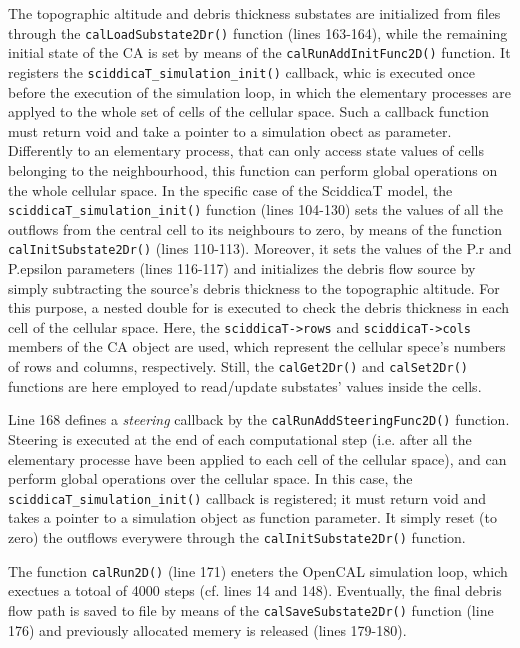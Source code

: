 The topographic altitude and debris thickness substates are
initialized from files through the \verb'calLoadSubstate2Dr()'
function (lines 163-164), while the remaining initial state of the CA
is set by means of the \verb'calRunAddInitFunc2D()' function. It
registers the \verb'sciddicaT_simulation_init()' callback, whic is
executed once before the execution of the simulation loop, in which
the elementary processes are applyed to the whole set of cells of the
cellular space. Such a callback function must return void and take a
pointer to a simulation obect as parameter. Differently to an
elementary process, that can only access state values of cells
belonging to the neighbourhood, this function can perform global
operations on the whole cellular space. In the specific case of the
SciddicaT model, the \verb'sciddicaT_simulation_init()' function
(lines 104-130) sets the values of all the outflows from the central
cell to its neighbours to zero, by means of the function
\verb'calInitSubstate2Dr()' (lines 110-113). Moreover, it sets the
values of the P.r and P.epsilon parameters (lines 116-117) and
initializes the debris flow source by simply subtracting the source's
debris thickness to the topographic altitude. For this purpose, a
nested double for is executed to check the debris thickness in each
cell of the cellular space. Here, the \verb'sciddicaT->rows' and
\verb'sciddicaT->cols' members of the CA object are used, which
represent the cellular spece's numbers of rows and columns,
respectively. Still, the \verb'calGet2Dr()' and \verb'calSet2Dr()'
functions are here employed to read/update substates' values inside
the cells.

Line 168 defines a \emph{steering} callback by
the \verb'calRunAddSteeringFunc2D()' function. Steering is executed at
the end of each computational step (i.e. after all the elementary
processe have been applied to each cell of the cellular space), and
can perform global operations over the cellular space. In this case,
the \verb'sciddicaT_simulation_init()' callback is registered; it must
return void and takes a pointer to a simulation object as function
parameter. It simply reset (to zero) the outflows everywere through
the \verb'calInitSubstate2Dr()' function.

The function \verb'calRun2D()' (line 171) eneters the OpenCAL
simulation loop, which exectues a totoal of 4000 steps (cf. lines 14
and 148). Eventually, the final debris flow path is saved to file by
means of the \verb'calSaveSubstate2Dr()' function (line 176) and
previously allocated memery is released (lines 179-180).

